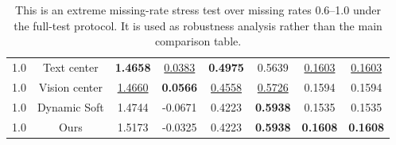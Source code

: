 \begin{table}[t]
\begin{tabular}{lccccccc}
1.0 & Text center & \textbf{1.4658} & \underline{0.0383} & \textbf{0.4975} & 0.5639 & \underline{0.1603} & \underline{0.1603} \\
1.0 & Vision center & \underline{1.4660} & \textbf{0.0566} & \underline{0.4558} & \underline{0.5726} & 0.1594 & 0.1594 \\
1.0 & Dynamic Soft & 1.4744 & -0.0671 & 0.4223 & \textbf{0.5938} & 0.1535 & 0.1535 \\
1.0 & Ours & 1.5173 & -0.0325 & 0.4223 & \textbf{0.5938} & \textbf{0.1608} & \textbf{0.1608} \\
\bottomrule
\end{tabular}
\caption{This is an extreme missing-rate stress test over missing rates 0.6--1.0 under the full-test protocol. It is used as robustness analysis rather than the main comparison table.}
\label{tab:stress_06_10}
\end{table}